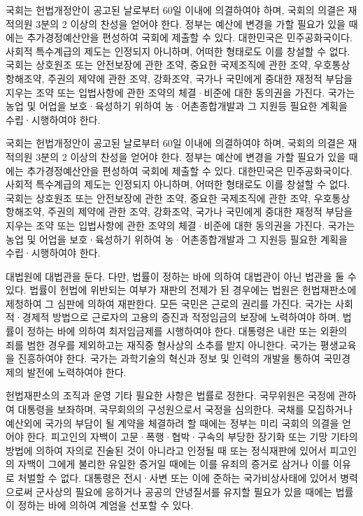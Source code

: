 \documentclass[master, korean]{pnuthesis}
\begin{document}
국회는 헌법개정안이 공고된 날로부터 60일 이내에 의결하여야 하며, 국회의 의결은 재적의원 3분의 2 이상의 찬성을 얻어야 한다. 정부는 예산에 변경을 가할 필요가 있을 때에는 추가경정예산안을 편성하여 국회에 제출할 수 있다. 대한민국은 민주공화국이다. 사회적 특수계급의 제도는 인정되지 아니하며, 어떠한 형태로도 이를 창설할 수 없다. 국회는 상호원조 또는 안전보장에 관한 조약, 중요한 국제조직에 관한 조약, 우호통상항해조약, 주권의 제약에 관한 조약, 강화조약, 국가나 국민에게 중대한 재정적 부담을 지우는 조약 또는 입법사항에 관한 조약의 체결·비준에 대한 동의권을 가진다. 국가는 농업 및 어업을 보호·육성하기 위하여 농·어촌종합개발과 그 지원등 필요한 계획을 수립·시행하여야 한다.

\pagebreak
\acknowledgement %

국회는 헌법개정안이 공고된 날로부터 60일 이내에 의결하여야 하며, 국회의 의결은 재적의원 3분의 2 이상의 찬성을 얻어야 한다. 정부는 예산에 변경을 가할 필요가 있을 때에는 추가경정예산안을 편성하여 국회에 제출할 수 있다. 대한민국은 민주공화국이다. 사회적 특수계급의 제도는 인정되지 아니하며, 어떠한 형태로도 이를 창설할 수 없다. 국회는 상호원조 또는 안전보장에 관한 조약, 중요한 국제조직에 관한 조약, 우호통상항해조약, 주권의 제약에 관한 조약, 강화조약, 국가나 국민에게 중대한 재정적 부담을 지우는 조약 또는 입법사항에 관한 조약의 체결·비준에 대한 동의권을 가진다. 국가는 농업 및 어업을 보호·육성하기 위하여 농·어촌종합개발과 그 지원등 필요한 계획을 수립·시행하여야 한다.

대법원에 대법관을 둔다. 다만, 법률이 정하는 바에 의하여 대법관이 아닌 법관을 둘 수 있다. 법률이 헌법에 위반되는 여부가 재판의 전제가 된 경우에는 법원은 헌법재판소에 제청하여 그 심판에 의하여 재판한다. 모든 국민은 근로의 권리를 가진다. 국가는 사회적·경제적 방법으로 근로자의 고용의 증진과 적정임금의 보장에 노력하여야 하며, 법률이 정하는 바에 의하여 최저임금제를 시행하여야 한다. 대통령은 내란 또는 외환의 죄를 범한 경우를 제외하고는 재직중 형사상의 소추를 받지 아니한다. 국가는 평생교육을 진흥하여야 한다. 국가는 과학기술의 혁신과 정보 및 인력의 개발을 통하여 국민경제의 발전에 노력하여야 한다.

헌법재판소의 조직과 운영 기타 필요한 사항은 법률로 정한다. 국무위원은 국정에 관하여 대통령을 보좌하며, 국무회의의 구성원으로서 국정을 심의한다. 국채를 모집하거나 예산외에 국가의 부담이 될 계약을 체결하려 할 때에는 정부는 미리 국회의 의결을 얻어야 한다. 피고인의 자백이 고문·폭행·협박·구속의 부당한 장기화 또는 기망 기타의 방법에 의하여 자의로 진술된 것이 아니라고 인정될 때 또는 정식재판에 있어서 피고인의 자백이 그에게 불리한 유일한 증거일 때에는 이를 유죄의 증거로 삼거나 이를 이유로 처벌할 수 없다. 대통령은 전시·사변 또는 이에 준하는 국가비상사태에 있어서 병력으로써 군사상의 필요에 응하거나 공공의 안녕질서를 유지할 필요가 있을 때에는 법률이 정하는 바에 의하여 계엄을 선포할 수 있다.
\end{document}
